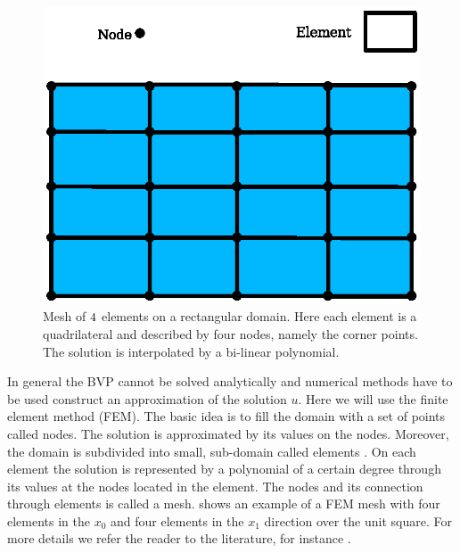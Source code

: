 \begin{figure}
\centerline{\includegraphics[width=\figwidth]{FirstStepMesh}}
\caption{Mesh of $4 \time 4$ elements on a rectangular domain.  Here
each element is a quadrilateral and described by four nodes, namely
the corner points. The solution is interpolated by a bi-linear
polynomial.}
\label{fig:FirstSteps.2}
\end{figure}

In general the BVP cannot be solved analytically and numerical
methods have to be used construct an approximation of the solution
$u$. Here we will use the finite element method (FEM). The basic idea is to fill the domain with a
set of points called nodes. The solution is approximated by its
values on the nodes. Moreover, the domain is subdivided into small,
sub-domain called elements . On each element the solution is
represented by a polynomial of a certain degree through its values at
the nodes located in the element. The nodes and its connection through
elements is called a mesh.  shows an
example of a FEM mesh with four elements in the $x_0$ and four elements
in the $x_1$ direction over the unit square.  
For more details we refer the reader to the literature, for instance
.

